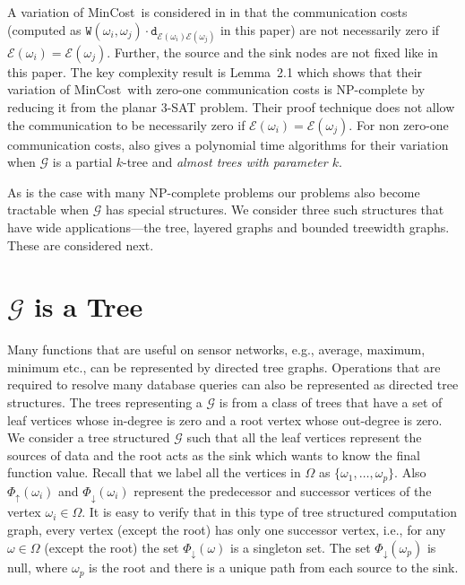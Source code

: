 \documentclass[journal]{IEEEtran}
\newcommand{\compgraph}{\mathcal{G}}
\newcommand{\compnodes}{\Omega}
\newcommand{\prenodes}[1]{\Phi_{\uparrow}(#1)}
\newcommand{\sucnodes}[1]{\Phi_{\downarrow}(#1)}
\newcommand{\distance}{\mathtt{d}} \newcommand{\edgewt}{\mathtt{W}} \newcommand{\processingwt}{\mathtt{P}}
\newcommand{\mincost}{\textsf{MinCost}}
\newcommand{\embedding}{\mathcal{E}}
\begin{document}
A variation of \mincost\ is considered in \cite{Fernandez-Baca89} in
that the communication costs (computed as $\edgewt(\omega_i,\omega_j)
\cdot \distance_{\embedding(\omega_i)\embedding(\omega_j)}$ in this
paper) are not necessarily zero if $\embedding(\omega_i) =
\embedding(\omega_j).$ Further, the source and the sink nodes are not
fixed like in this paper. The key complexity result is Lemma~2.1 which
shows that their variation of \mincost\ with zero-one communication
costs is NP-complete by reducing it from the planar $3$-SAT
problem. Their proof technique does not allow the communication to be
necessarily zero if $\embedding(\omega_i) = \embedding(\omega_j).$ For
non zero-one communication costs, \cite{Fernandez-Baca89} also gives a
polynomial time algorithms for their variation when $\compgraph$ is a
partial $k$-tree and \textit{almost trees with parameter $k.$} 

As is the case with many NP-complete problems our problems also become
tractable when $\compgraph$ has special structures. We consider three
such structures that have wide applications---the tree, layered graphs
and bounded treewidth graphs. These are considered next.

\section{$\compgraph$ is a Tree}
\label{sec:tree}
Many functions that are useful on sensor networks, e.g., average,
maximum, minimum etc., can be represented by directed tree
graphs. Operations that are required to resolve many database queries
can also be represented as directed tree structures.  The trees
representing a $\compgraph$ is from a class of trees that have a set
of leaf vertices whose in-degree is zero and a root vertex whose
out-degree is zero. We consider a tree structured $\compgraph$ such
that all the leaf vertices represent the sources of data and the root
acts as the sink which wants to know the final function value. Recall
that we label all the vertices in $\compnodes$ as
$\{\omega_1,\ldots,\omega_p\}.$ Also $\prenodes{\omega_i}$ and
  $\sucnodes{\omega_i}$ represent the predecessor and successor
  vertices of the vertex $\omega_i \in \compnodes.$ It is easy to
verify that in this type of tree structured computation graph, every
vertex (except the root) has only one successor vertex, i.e., for any
$\omega \in \compnodes$ (except the root) the set $\sucnodes{\omega}$
is a singleton set. The set $\sucnodes{\omega_p}$ is null, where
$\omega_p$ is the root and there is a unique path from each source to
the sink.
\end{document}
